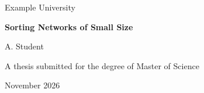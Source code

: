 \begin{titlepage}
  \centering
  {\Large Example University\par}
  \vspace{2cm}
  {\huge\bfseries Sorting Networks of Small Size\par}
  \vspace{1cm}
  {\large A. Student\par}
  \vfill
  A thesis submitted for the degree of Master of Science\par
  November 2026
\end{titlepage}
